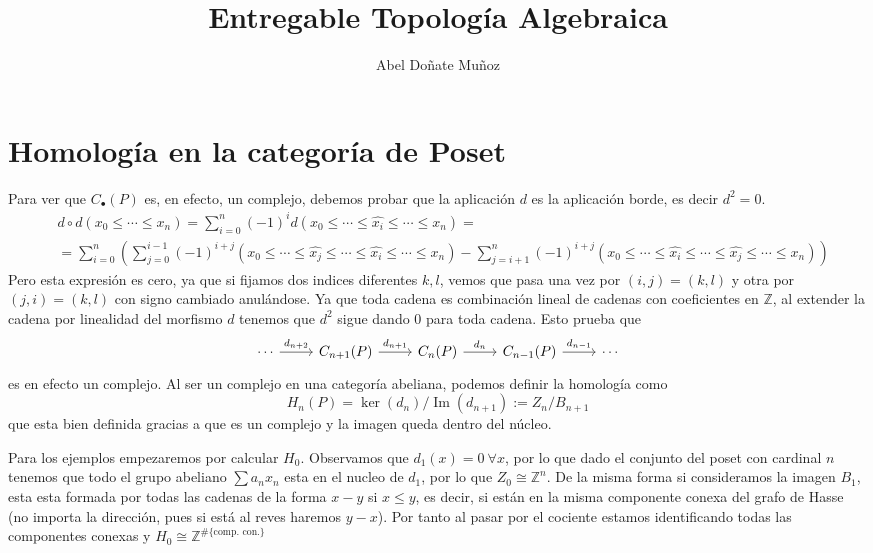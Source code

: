 \documentclass[leqno]{article}
\title{Entregable Topología Algebraica}
\author{Abel Doñate Muñoz}
\date{}
\DeclareMathOperator{\im}{Im}
\begin{document}
\maketitle
\tableofcontents
\newpage

\section{Homología en la categoría de Poset}

Para ver que $C_{\bullet}(P)$ es, en efecto, un complejo, debemos probar que la aplicación $d$ es la aplicación borde, es decir  $d^2 = 0$.
 \begin{align*}
 &d\circ d (x_0\le \cdots \le x_n) = \sum_{i=0}^n (-1)^{i} d(x_0\le  \cdots \le  \hat{x_i} \le \cdots\le x_n) = \\
 &=\sum_{i=0}^n \left( \sum_{j=0}^{i-1} (-1)^{i+j}(x_0\le \cdots\le \hat{x_j}\le \cdots \le \hat{x_i}\le \cdots \le x_n)  - \sum_{j=i+1}^{n} (-1)^{i+j} (x_0\le \cdots\le \hat{x_i}\le \cdots \le \hat{x_j}\le \cdots \le x_n) \right) 
\end{align*}
Pero esta expresión es cero, ya que si fijamos dos indices diferentes $k, l$, vemos que pasa una vez por  $(i, j)=(k, l)$ y otra por  $(j, i) = (k, l)$ con signo cambiado anulándose. Ya que toda cadena es combinación lineal de cadenas con coeficientes en $\mathbb{Z}$, al extender la cadena por linealidad del morfismo $d$ tenemos que  $d^2$ sigue dando  $0$ para toda cadena. Esto prueba que 
\[\begin{tikzcd}
	\cdots & {C_{n+1}(P)} & {C_n(P)} & {C_{n-1}(P)} & \cdots
	\arrow["d_{n+1}", from=1-2, to=1-3]
	\arrow["d_{n}", from=1-3, to=1-4]
	\arrow["d_{n+2}", from=1-1, to=1-2]
	\arrow["d_{n-1}", from=1-4, to=1-5]
\end{tikzcd}\]
es en efecto un complejo. Al ser un complejo en una categoría abeliana, podemos definir la homología como
\[
H_n(P) = \ker(d_n) / \im (d_{n+1}) := Z_n / B_{n+1}
\]
que esta bien definida gracias a que es un complejo y la imagen queda dentro del núcleo.

Para los ejemplos empezaremos por calcular $H_0$. Observamos que $d_1(x)=0\ \forall x$, por lo que dado el conjunto del poset con cardinal $n$ tenemos que todo el grupo abeliano $\sum a_n x_n$ esta en el nucleo de  $d_1$, por lo que  $Z_0 \cong  \mathbb{Z}^n$. De la misma forma si consideramos la imagen $B_1$, esta esta formada por todas las cadenas de la forma $x-y$ si  $x\le y$, es decir, si están en la misma componente conexa del grafo de Hasse (no importa la dirección, pues si está al reves haremos $y-x$). Por tanto al pasar por el cociente estamos identificando todas las componentes conexas y $H_0 \cong \mathbb{Z}^{\# \{\text{comp. con.}\}}$
\end{document}

